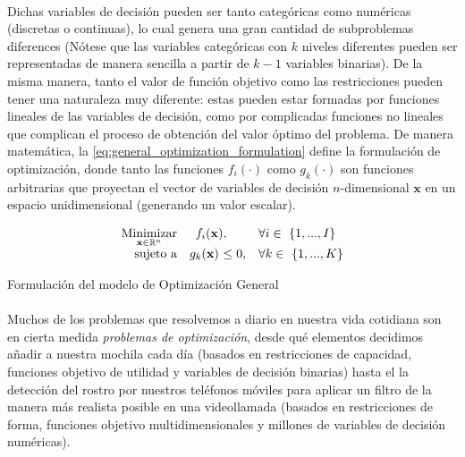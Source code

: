 \documentclass{subfiles}
\begin{document}
        \paragraph{}
        Dichas variables de decisión pueden ser tanto categóricas como numéricas (discretas o continuas), lo cual genera una gran cantidad de subproblemas diferences (Nótese que las variables categóricas con $k$ niveles diferentes pueden ser representadas de manera sencilla a partir de $k-1$ variables binarias). De la misma manera, tanto el valor de función objetivo como las restricciones pueden tener una naturaleza muy diferente: estas pueden estar formadas por funciones lineales de las variables de decisión, como por complicadas funciones no lineales que complican el proceso de obtención del valor óptimo del problema. De manera matemática, la \cref{eq:general_optimization_formulation} define la formulación de optimización, donde tanto las funciones $f_i(\cdot)$ como $g_k(\cdot)$ son funciones arbitrarias que proyectan el vector de variables de decisión $n$-dimensional $\mathbf{x}$ en un espacio unidimensional (generando un valor escalar).

        \begin{eqfloat}
          \begin{equation}
            \begin{array}{rr@{}ll}
              \underset{\mathbf{x} \in \mathbb{R}^{n}}{\text{Minimizar}} & f_i(\mathbf{x}) &                 ,& \forall i \in \{1,...,I\} \\
              \text{sujeto a}	 & g_k(\mathbf{x}) \ &\leq 0, & \forall k \in \{1,...,K\}
            \end{array}
          \end{equation}
          \caption{Formulación del modelo de Optimización General}
          \label{eq:general_optimization_formulation}
        \end{eqfloat}

        \paragraph{}
        Muchos de los problemas que resolvemos a diario en nuestra vida cotidiana son en cierta medida \emph{problemas de optimización}, desde qué elementos decidimos añadir a nuestra mochila cada día (basados en restricciones de capacidad, funciones objetivo de utilidad y variables de decisión binarias) hasta el la detección del rostro por nuestros teléfonos móviles para aplicar un filtro de la manera más realista posible en una videollamada (basados en restricciones de forma, funciones objetivo multidimensionales y millones de variables de decisión numéricas).
\end{document}

